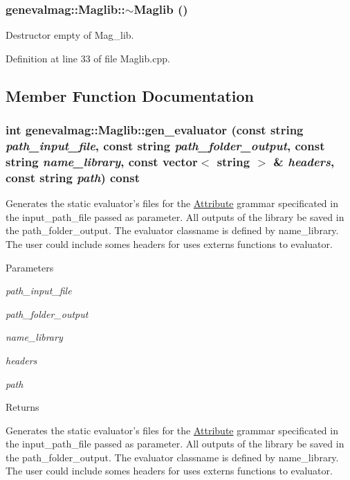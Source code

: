 \hypertarget{classgenevalmag_1_1Maglib_a43af6f1f2439a9bb50f6fb273b48739c}{
\subsubsection[{$\sim$Maglib}]{\setlength{\rightskip}{0pt plus 5cm}genevalmag::Maglib::$\sim$Maglib ()}}
\label{classgenevalmag_1_1Maglib_a43af6f1f2439a9bb50f6fb273b48739c}
Destructor empty of Mag\_\-lib. 

Definition at line 33 of file Maglib.cpp.



\subsection{Member Function Documentation}
\hypertarget{classgenevalmag_1_1Maglib_ac86d9edcd1aefa47760a6dba4e0e2208}{
\subsubsection[{gen\_\-evaluator}]{\setlength{\rightskip}{0pt plus 5cm}int genevalmag::Maglib::gen\_\-evaluator (const string {\em path\_\-input\_\-file}, \/  const string {\em path\_\-folder\_\-output}, \/  const string {\em name\_\-library}, \/  const vector$<$ string $>$ \& {\em headers}, \/  const string {\em path}) const}}
\label{classgenevalmag_1_1Maglib_ac86d9edcd1aefa47760a6dba4e0e2208}
Generates the static evaluator's files for the \hyperlink{classgenevalmag_1_1Attribute}{Attribute} grammar specificated in the input\_\-path\_\-file passed as parameter. All outputs of the library be saved in the path\_\-folder\_\-output. The evaluator classname is defined by name\_\-library. The user could include somes headers for uses externs functions to evaluator.


\begin{DoxyParams}{Parameters}
\item[{\em path\_\-input\_\-file}]\item[{\em path\_\-folder\_\-output}]\item[{\em name\_\-library}]\item[{\em headers}]\item[{\em path}]\end{DoxyParams}
\begin{DoxyReturn}{Returns}

\end{DoxyReturn}
Generates the static evaluator's files for the \hyperlink{classgenevalmag_1_1Attribute}{Attribute} grammar specificated in the input\_\-path\_\-file passed as parameter. All outputs of the library be saved in the path\_\-folder\_\-output. The evaluator classname is defined by name\_\-library. The user could include somes headers for uses externs functions to evaluator. 


